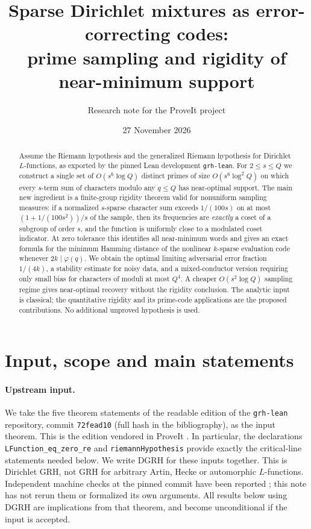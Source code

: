 \documentclass[11pt]{article}
\title{Sparse Dirichlet mixtures as error-correcting codes:\\prime sampling and rigidity of near-minimum support}
\author{Research note for the ProveIt project}
\date{27 November 2026}
\theoremstyle{definition}\newtheorem{remark}[theorem]{Remark}
\newcommand{\GRH}{\textup{DGRH}}
\begin{document}
\maketitle
\begin{abstract}
Assume the Riemann hypothesis and the generalized Riemann hypothesis for Dirichlet $L$-functions, as exported by the pinned Lean development \texttt{grh-lean}. For $2\le s\le Q$ we construct a single set of $O(s^6\log Q)$ distinct primes of size $O(s^6\log^2 Q)$ on which every $s$-term sum of characters modulo any $q\le Q$ has near-optimal support. The main new ingredient is a finite-group rigidity theorem valid for nonuniform sampling measures: if a normalized $s$-sparse character sum exceeds $1/(100s)$ on at most $(1+1/(100s^2))/s$ of the sample, then its frequencies are \emph{exactly} a coset of a subgroup of order $s$, and the function is uniformly close to a modulated coset indicator. At zero tolerance this identifies all near-minimum words and gives an exact formula for the minimum Hamming distance of the nonlinear $k$-sparse evaluation code whenever $2k\mid\varphi(q)$. We obtain the optimal limiting adversarial error fraction $1/(4k)$, a stability estimate for noisy data, and a mixed-conductor version requiring only small bias for characters of moduli at most $Q^4$. A cheaper $O(s^2\log Q)$ sampling regime gives near-optimal recovery without the rigidity conclusion. The analytic input is classical; the quantitative rigidity and its prime-code applications are the proposed contributions. No additional unproved hypothesis is used.
\end{abstract}
\tableofcontents
\section{Input, scope and main statements}
\paragraph{Upstream input.} We take the five theorem statements of the readable edition of the \texttt{grh-lean} repository, commit \texttt{72fead10} (full hash in the bibliography), as the input theorem. This is the edition vendored in ProveIt \cite{vendor,upstream}. In particular, the declarations \texttt{LFunction\_eq\_zero\_re} and \texttt{riemannHypothesis} provide exactly the critical-line statements needed below. We write \GRH{} for these inputs together. This is Dirichlet GRH, not GRH for arbitrary Artin, Hecke or automorphic $L$-functions. Independent machine checks at the pinned commit have been reported \cite{sutherland}; this note has not rerun them or formalized its own arguments. All results below using \GRH{} are implications from that theorem, and become unconditional if the input is accepted.
\end{document}
